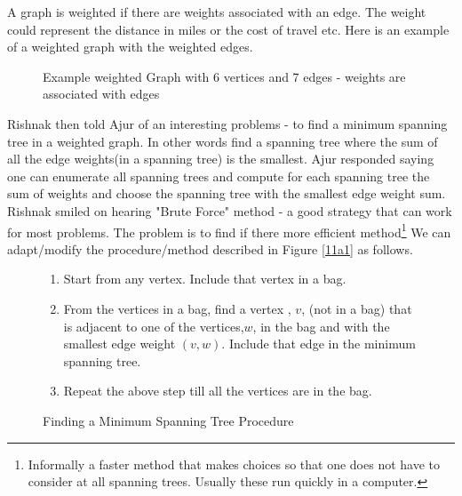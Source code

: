 A graph is weighted if there are weights associated with an edge. The weight could represent the distance in miles or the cost of travel etc. Here is an example of a weighted graph with the weighted edges.
\begin{figure}
\begin{center}
\caption{ Example weighted Graph with 6 vertices and 7 edges - weights are associated with edges}\label{11g7}
\end{center}
\end{figure}

Rishnak then told Ajur of an interesting problems - to find a minimum spanning tree in a weighted graph. In other words find a spanning tree where the sum of all the edge weights(in a spanning tree) is the smallest. Ajur responded saying one can enumerate all spanning trees and compute for each spanning tree the sum of weights and choose the spanning tree with the smallest edge weight sum. Rishnak smiled on hearing  "Brute Force" method - a good strategy that can work for most problems. The problem is to find if there more efficient method\footnote{Informally a faster method that makes choices so that one does not have to consider at all spanning trees. Usually these run quickly in a computer.} We can adapt/modify the procedure/method described in Figure \ref{11a1} as follows.
\begin{figure} 
\begin{enumerate}
\item Start from any vertex. Include that vertex in a bag.
\item From the vertices in a bag, find a vertex , $v$, (not in a bag) that is adjacent to one of the vertices,$w$, in the bag and with the smallest edge weight $(v,w)$. Include that edge in the minimum spanning tree.
\item Repeat the above step till all the vertices are in the bag.
\end{enumerate}
\caption{Finding a  Minimum Spanning Tree Procedure}\label{11aa}
\end{figure}

